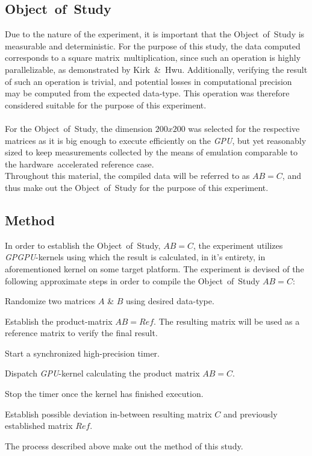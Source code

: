 \documentclass[fleqn,10pt]{SelfArx} %
\begin{document}
\subsection{Object~of~Study}
\label{sec:contribution:objectofstudy}
Due to the nature of the experiment, it is important that the Object~of~Study is measurable and deterministic. For the purpose of this study, the data computed corresponds to a square matrix~multiplication, since such an operation is highly parallelizable, as demonstrated by Kirk~\&~Hwu\cite[ch.~3]{Kirk:2010:PMP:1841511}. Additionally, verifying the result of such an operation is trivial, and potential losses in computational precision may be computed from the expected data-type. This operation was therefore considered suitable for the purpose of this experiment.\\
\\
For the Object~of~Study, the dimension $200x200$ was selected for the respective matrices as it is big enough to execute efficiently on the \textit{GPU}, but yet reasonably sized to keep measurements collected by the means of emulation comparable to the hardware~accelerated reference case. \\
Throughout this material, the compiled data will be referred to as $AB=C$, and thus make out the Object~of~Study for the purpose of this experiment.

\subsection{Method}
\label{sec:contribution:method}
In order to establish the Object~of~Study, $AB=C$, the experiment utilizes \textit{GPGPU}-kernels using which the result is calculated, in it’s entirety, in aforementioned kernel on some target platform. The experiment is devised of the following approximate steps in order to compile the Object~of~Study $AB=C$:
\begin{enumerate*}
	\item Randomize two matrices $A$ \& $B$ using desired data-type.
	\item Establish the product-matrix $AB=Ref$. The resulting matrix will be used as a reference matrix to verify the final result.
	\item Start a synchronized high-precision timer.
	\item Dispatch \textit{GPU}-kernel calculating the product matrix $AB=C$.
	\item Stop the timer once the kernel has finished execution.
	\item Establish possible deviation in-between resulting matrix $C$ and previously established matrix $Ref$.
\end{enumerate*}
The process described above make out the method of this study.
\end{document}
